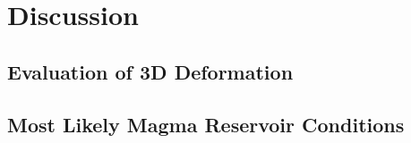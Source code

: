 \chapter{Discussion}
\section{Evaluation of 3D Deformation}
\section{Most Likely Magma Reservoir Conditions}